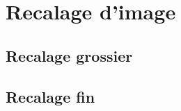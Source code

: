 \section{Recalage d'image \label{sec:registration}}

\subsection{Recalage grossier}
\subsection{Recalage fin}